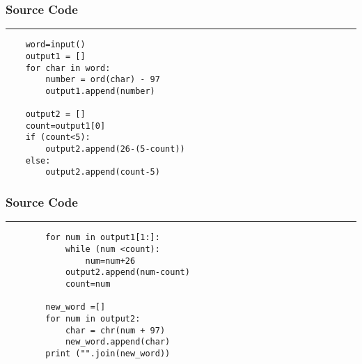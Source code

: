 \documentclass[12pt]{beamer}
\begin{document}
\begin{frame}[fragile]
    \frametitle{Source Code}
    \rule{\textwidth}{1pt}
    \scriptsize
    \begin{verbatim}
    word=input()
    output1 = []
    for char in word:
        number = ord(char) - 97
        output1.append(number)

    output2 = []
    count=output1[0]
    if (count<5):
        output2.append(26-(5-count))
    else:
        output2.append(count-5)
    \end{verbatim}
        
        
\end{frame}

\begin{frame}[fragile]
    \frametitle{Source Code}
    \rule{\textwidth}{1pt}
    \scriptsize
    \begin{verbatim}
        for num in output1[1:]:
            while (num <count):
                num=num+26
            output2.append(num-count)
            count=num
            
        new_word =[]    
        for num in output2:
            char = chr(num + 97)
            new_word.append(char)
        print ("".join(new_word))
    \end{verbatim}
    
    
\end{frame}
\end{document}
